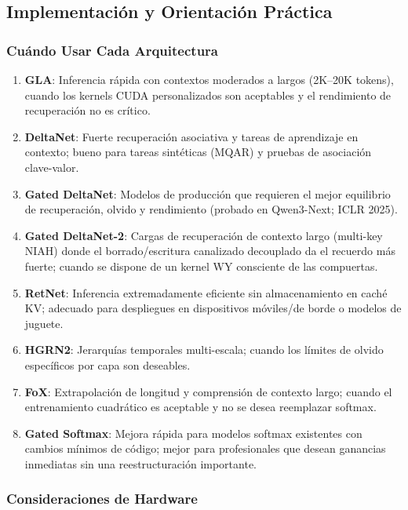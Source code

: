 \subsection{Implementación y Orientación Práctica}

\subsubsection{Cuándo Usar Cada Arquitectura}

\begin{enumerate}[leftmargin=*]
    \item \textbf{GLA}: Inferencia rápida con contextos moderados a largos (2K--20K tokens), cuando los kernels CUDA personalizados son aceptables y el rendimiento de recuperación no es crítico.
    \item \textbf{DeltaNet}: Fuerte recuperación asociativa y tareas de aprendizaje en contexto; bueno para tareas sintéticas (MQAR) y pruebas de asociación clave-valor.
    \item \textbf{Gated DeltaNet}: Modelos de producción que requieren el mejor equilibrio de recuperación, olvido y rendimiento (probado en Qwen3-Next; ICLR 2025).
    \item \textbf{Gated DeltaNet-2}: Cargas de recuperación de contexto largo (multi-key NIAH) donde el borrado/escritura canalizado decouplado da el recuerdo más fuerte; cuando se dispone de un kernel WY consciente de las compuertas.
    \item \textbf{RetNet}: Inferencia extremadamente eficiente sin almacenamiento en caché KV; adecuado para despliegues en dispositivos móviles/de borde o modelos de juguete.
    \item \textbf{HGRN2}: Jerarquías temporales multi-escala; cuando los límites de olvido específicos por capa son deseables.
    \item \textbf{FoX}: Extrapolación de longitud y comprensión de contexto largo; cuando el entrenamiento cuadrático es aceptable y no se desea reemplazar softmax.
    \item \textbf{Gated Softmax}: Mejora rápida para modelos softmax existentes con cambios mínimos de código; mejor para profesionales que desean ganancias inmediatas sin una reestructuración importante.
\end{enumerate}

\subsubsection{Consideraciones de Hardware}

